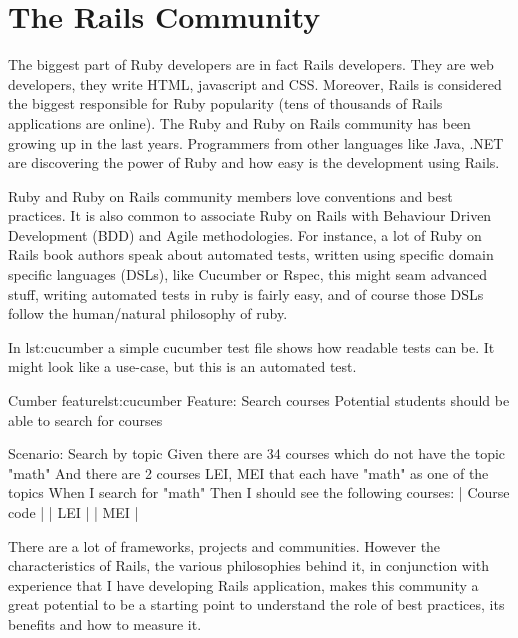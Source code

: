 \section{The Rails Community} 
The biggest part of Ruby developers are in fact Rails developers. 
They are web developers, they write HTML, javascript and CSS.
Moreover, Rails is considered the biggest responsible for Ruby popularity
(tens of thousands of Rails applications are online).
The Ruby and Ruby on Rails community has been growing up in the last years. 
Programmers from other languages like Java, .NET are discovering the power of Ruby and how easy is the development using Rails.

Ruby and Ruby on Rails community members love conventions and best practices.
It is also common to associate Ruby on Rails with Behaviour Driven Development (BDD) and Agile methodologies.
For instance, a lot of Ruby on Rails book authors speak about automated tests, 
written using specific domain specific languages (DSLs), like Cucumber or Rspec, 
this might seam advanced stuff, writing automated tests in ruby is fairly easy,
and of course those DSLs follow the human/natural philosophy of ruby.

In lst:cucumber a simple cucumber test file shows how readable tests can be.
It might look like a use-case, but this is an automated test.

\begin{rubycode}{Cumber feature}{lst:cucumber}
Feature: Search courses
  Potential students should be able to search for courses

  Scenario: Search by topic
    Given there are 34 courses which do not have the topic "math"
    And there are 2 courses LEI, MEI that each have "math" as one of the topics
    When I search for "math"
    Then I should see the following courses:
      | Course code |
      | LEI         |
      | MEI         |
\end{rubycode}

There are a lot of frameworks, projects and communities. 
However the characteristics of Rails, the various philosophies behind it,
in conjunction with experience that I have developing Rails application,
makes this community a great potential to be a starting point to understand the role of best practices, 
its benefits and how to measure it.

